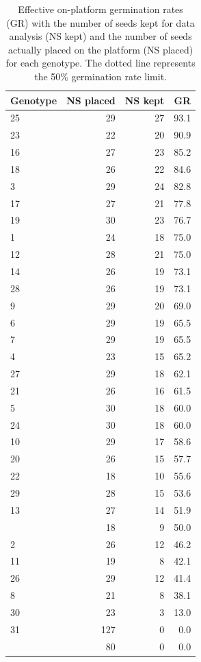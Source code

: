 \begin{table}[hbtp]
\centering
\caption[Effective germination rates]{Effective on-platform germination rates (GR) with the number of seeds kept for data analysis (NS kept) and the number 
of seeds actually placed on the platform (NS placed) for each genotype. The dotted line represents the 50\% germination rate limit.} 
\begin{tabular}{lrrr}
  \toprule
Genotype & NS placed & NS kept & GR \\ 
  \midrule
25 & 29 & 27 & 93.1 \\ 
  23 & 22 & 20 & 90.9 \\ 
  16 & 27 & 23 & 85.2 \\ 
  18 & 26 & 22 & 84.6 \\ 
  3 & 29 & 24 & 82.8 \\ 
  17 & 27 & 21 & 77.8 \\ 
  19 & 30 & 23 & 76.7 \\ 
  1 & 24 & 18 & 75.0 \\ 
  12 & 28 & 21 & 75.0 \\ 
  14 & 26 & 19 & 73.1 \\ 
  28 & 26 & 19 & 73.1 \\ 
  9 & 29 & 20 & 69.0 \\ 
  6 & 29 & 19 & 65.5 \\ 
  7 & 29 & 19 & 65.5 \\ 
  4 & 23 & 15 & 65.2 \\ 
  27 & 29 & 18 & 62.1 \\ 
  21 & 26 & 16 & 61.5 \\ 
  5 & 30 & 18 & 60.0 \\ 
  24 & 30 & 18 & 60.0 \\ 
  10 & 29 & 17 & 58.6 \\ 
  20 & 26 & 15 & 57.7 \\ 
  22 & 18 & 10 & 55.6 \\ 
  29 & 28 & 15 & 53.6 \\ 
  13 & 27 & 14 & 51.9 \\\hdashline 
  15 & 18 & 9 & 50.0 \\ 
  2 & 26 & 12 & 46.2 \\ 
  11 & 19 & 8 & 42.1 \\ 
  26 & 29 & 12 & 41.4 \\ 
  8 & 21 & 8 & 38.1 \\ 
  30 & 23 & 3 & 13.0 \\ 
  31 & 127 & 0 & 0.0 \\ 
   & 80 & 0 & 0.0 \\ 
   \bottomrule
\end{tabular}
\label{tab:updated_germ_rates}
\end{table}

